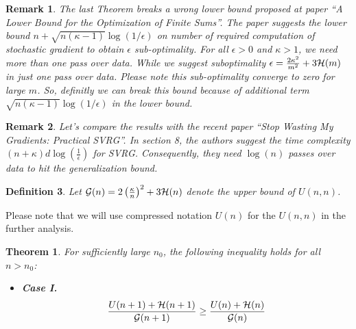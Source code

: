 \documentclass{article}
\newtheorem{definition}{Definition}
\newtheorem{theorem}{Theorem}
\newtheorem{remark}[definition]{Remark}
\newcommand{\bound}{{\cal H}}
\newcommand{\ERMbound}{{\cal G}}
\begin{document}
\begin{remark}
	The last Theorem breaks a wrong lower bound proposed at paper ``A Lower Bound
	for the Optimization of Finite Sums''. The paper suggests the lower bound $n+
	\sqrt{n(\kappa -1 )}\log(1/\epsilon)$ on number of required computation of
	stochastic gradient to obtain $\epsilon$ sub-optimality. For all $\epsilon>0$
	and $\kappa>1$, we need more than one pass over data. While we suggest
	suboptimality $\epsilon = \frac{2\kappa^2}{m^2} + 3 \bound(m)$ in just one pass
	over data. Please note this sub-optimality converge to zero for large $m$. So, definitly we can break this
	bound because of additional term $\sqrt{n(\kappa -1 )}\log(1/\epsilon)$ in the
	lower bound.
\end{remark}
\begin{remark}
	Let's compare the results with the recent paper ``Stop Wasting My Gradients:
	Practical SVRG''. In section 8, the authors suggest the time complexity 
	$(n+\kappa)d \log(\frac{1}{\epsilon})$ for SVRG. Consequently, they need
	$\log(n)$ passes over data to hit the generalization bound.
\end{remark}
\begin{definition}
	Let $\ERMbound(n) = 2 \left(\frac{\kappa}{n}\right)^2 + 3 \bound(n)$ denote 
	the upper bound of $U(n,n)$. 
\end{definition}
Please note that we will use compressed notation $U(n)$ for the $U(n,n)$ in the
further analysis.
\begin{theorem}
	For sufficiently large $n_0$, the following inequality holds for all $n>n_0$: 
	\begin{itemize}
	  \item \textbf{Case I.}
	  \begin{equation*}
		\frac{U(n+1)+\bound(n+1)}{\ERMbound(n+1)} \geq
		\frac{U(n)+\bound(n)}{\ERMbound(n)}
	\end{equation*}
	\end{itemize}
\end{theorem}
\end{document}
